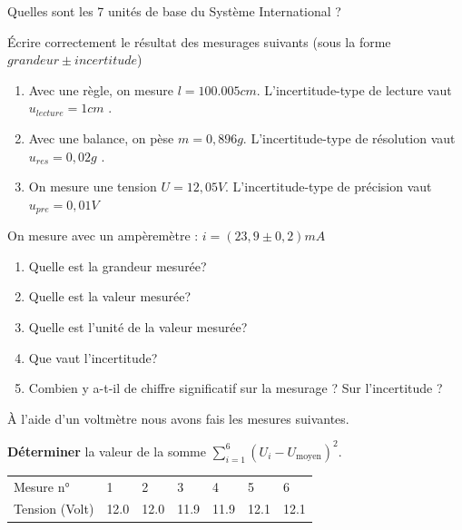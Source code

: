 \documentclass[11pt]{exam}		%
\begin{document}
\begin{questions}
	\question[1] Quelles sont les 7 unités de base du Système International ?

	\question[1\half] Écrire correctement le résultat des mesurages suivants (sous la forme $grandeur \pm incertitude$)
	\begin{enumerate}[label=\alph*)]
		\item 	Avec une règle, on mesure $l = 100.005 cm$. L'incertitude-type de lecture vaut $u_{lecture}= 1 cm$ .
		\item 	Avec une balance, on pèse $m = 0,896 g$. L'incertitude-type de résolution vaut $u_{res}=0,02 g$ .
		\item 	On mesure une tension $U = 12,05 V$. L'incertitude-type de précision vaut $u_{pre} =0,01V$
	\end{enumerate}

	\question[2\half]
	On mesure avec un ampèremètre :  $i=(23,9 ± 0,2) mA$
	\begin{multicols}{2}
		\begin{enumerate}[label=\alph*)]
			\item Quelle est la grandeur mesurée?
			\item Quelle est la valeur mesurée?
			\item Quelle est l'unité de la valeur mesurée?
			\item Que vaut l'incertitude?
			\item Combien y a-t-il de chiffre significatif sur la mesurage ? Sur l'incertitude ?
		\end{enumerate}
	\end{multicols}

	\begin{minipage}[c]{0.6\textwidth}
		\question[3] À l'aide d'un voltmètre nous avons fais les mesures suivantes.

		\textbf{Déterminer} la valeur de la somme $\sum_{i=1}^6 ({U_i} - {U_\text{moyen}})^2$.
		\begin{center}
			\begin{tabular}{@{}|l|llllll|@{}} \toprule
				Mesure n°      & 1    & 2    & 3    & 4    & 5    & 6    \\
				Tension (Volt) & 12.0 & 12.0 & 11.9 & 11.9 & 12.1 & 12.1 \\\bottomrule
			\end{tabular}
		\end{center}


\end{minipage}
\end{questions}
\end{document}
